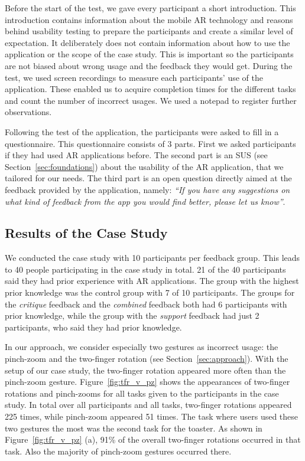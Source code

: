 \documentclass[manuscript]{acmart}
\begin{document}
			Before the start of the test, we gave every participant a short introduction. This introduction contains information about the mobile \ac{AR} technology and reasons behind usability testing to prepare the participants and create a similar level of expectation. It deliberately does not contain information about how to use the application or the scope of the case study. This is important so the participants are not biased about wrong usage and the feedback they would get. During the test, we used screen recordings to measure each participants' use of the application. These enabled us to acquire completion times for the different tasks and count the number of incorrect usages. We used a notepad to register further observations.

			Following the test of the application, the participants were asked to fill in a questionnaire. This questionnaire consists of 3 parts. First we asked participants if they had used \ac{AR} applications before. The second part is an \ac{SUS} (see Section~\ref{sec:foundations}) about the usability of the \ac{AR} application, that we tailored for our needs. The third part is an open question directly aimed at the feedback provided by the application, namely: \emph{``If you have any suggestions on what kind of feedback from the app you would find better, please let us know''}.

		\subsection{Results of the Case Study}\label{ssec:results}
			We conducted the case study with 10 participants per feedback group. This leads to 40 people participating in the case study in total. 21 of the 40 participants said they had prior experience with \ac{AR} applications. The group with the highest prior knowledge was the control group with 7 of 10 participants. The groups for the \emph{critique} feedback and the \emph{combined} feedback both had 6 participants with prior knowledge, while the group with the \emph{support} feedback had just 2 participants, who said they had prior knowledge.

			In our approach, we consider especially two gestures as incorrect usage: the pinch-zoom and the two-finger rotation (see Section~\ref{sec:approach}). With the setup of our case study, the two-finger rotation appeared more often than the pinch-zoom gesture. Figure~\ref{fig:tfr_v_pz} shows the appearances of two-finger rotations and pinch-zooms for all tasks given to the participants in the case study. In total over all participants and all tasks, two-finger rotations appeared 225 times, while pinch-zoom appeared 51 times. The task where users used these two gestures the most was the second task for the toaster. As shown in Figure~\ref{fig:tfr_v_pz} (a), 91\% of the overall two-finger rotations occurred in that task. Also the majority of pinch-zoom gestures occurred there.
\end{document}
